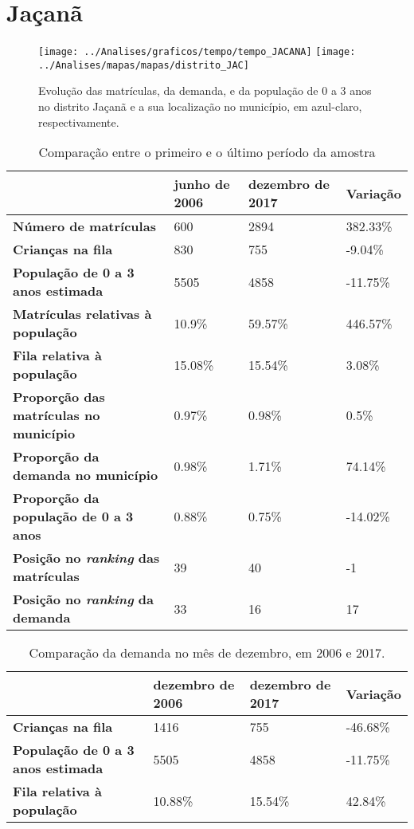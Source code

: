 \section{Jaçanã}
\begin{figure}[H]
\centering
\texttt{[image: ../Analises/graficos/tempo/tempo\_JACANA]}
\texttt{[image: ../Analises/mapas/mapas/distrito\_JAC]}
\caption{Evolução das matrículas, da demanda, e da população de 0 a 3 anos no distrito Jaçanã e a sua localização no município, em azul-claro, respectivamente.}
\end{figure}
\begin{table}[H]
\begin{tabular}{l|l|l|l}
\textbf{}                                      & \textbf{junho de 2006}       & \textbf{dezembro de 2017}    & \textbf{Variação} \\ \hline
\textbf{Número de matrículas}                  & 600 & 2894 & 382.33\% \\ \hline
\textbf{Crianças na fila}                      & 830 & 755 & -9.04\% \\ \hline
\textbf{População de 0 a 3 anos estimada}      & 5505 & 4858 & -11.75\% \\ \hline
\textbf{Matrículas relativas à população}      & 10.9\% & 59.57\% & 446.57\% \\ \hline
\textbf{Fila relativa à população}             & 15.08\% & 15.54\% & 3.08\% \\ \hline
\textbf{Proporção das matrículas no município} & 0.97\% & 0.98\% & 0.5\% \\ \hline
\textbf{Proporção da demanda no município}     & 0.98\% & 1.71\% & 74.14\% \\ \hline
\textbf{Proporção da população de 0 a 3 anos}  & 0.88\% & 0.75\% & -14.02\% \\ \hline
\textbf{Posição no \textit{ranking} das matrículas}     & 39 & 40 & -1 \\ \hline
\textbf{Posição no \textit{ranking} da demanda}         & 33 & 16 & 17 \\ 
\end{tabular}
\caption{Comparação entre o primeiro e o último período da amostra}
\end{table}
\begin{table}[H]
\begin{tabular}{l|l|l|l}
\textbf{}                                 & \textbf{dezembro de 2006} & \textbf{dezembro de 2017} & \textbf{Variação} \\ \hline
\textbf{Crianças na fila}                      & 1416 & 755 & -46.68\% \\ \hline
\textbf{População de 0 a 3 anos estimada}      & 5505 & 4858 & -11.75\% \\ \hline
\textbf{Fila relativa à população}             & 10.88\% & 15.54\% & 42.84\% \\
\end{tabular}
\caption{Comparação da demanda no mês de dezembro, em 2006 e 2017.}
\end{table}
